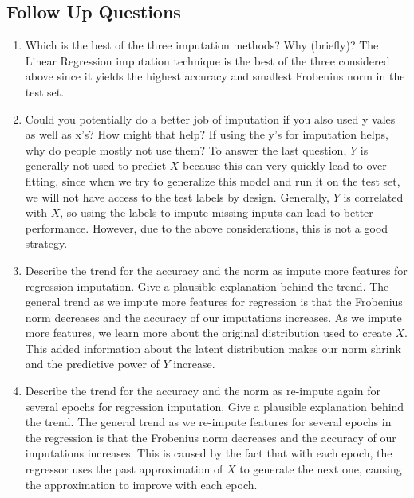 \subsection{Follow Up Questions}
\begin{enumerate}

    
    \item  Which is the best of the three imputation methods? Why (briefly)?
    	\newline \newline
    	The Linear Regression imputation technique is the best of the three considered above since it yields the highest accuracy and smallest Frobenius norm in the test set.
     
      \item Could you potentially do a better job of imputation if you also used y vales as well as x's? How might that help? If using the y's for imputation helps, why do people mostly not use them?
      \newline
      \newline
      To answer the last question, $Y$ is generally  not used to predict $X$ because this can very quickly lead to over-fitting, since when we try to generalize this model and run it on the test set, we will not have access to the test labels by design. 
      \newline
      \newline
      Generally, $Y$ is correlated with $X$, so using the labels to impute missing inputs can lead to better performance. However, due to the above considerations, this is not a good strategy.
         
    \item Describe the trend for the accuracy and the norm as impute more features for regression imputation. Give a plausible explanation behind the trend.
    \newline
    \newline
	The general trend as we impute more features for regression is that the Frobenius norm decreases and the accuracy of our imputations increases.
    \newline
    \newline
    As we impute more features, we learn more about the original distribution used to create $X$. This added information about the latent distribution makes our norm shrink and the predictive power of $Y$ increase.    
    \item Describe the trend for the accuracy and the norm as re-impute again for several epochs for regression imputation. Give a plausible explanation behind the trend.
        \newline
        \newline
    	The general trend as we re-impute features for several epochs in the regression is that the Frobenius norm decreases and the accuracy of our imputations increases.
        \newline
        \newline
	This is caused by the fact that with each epoch, the regressor uses the past approximation of $X$ to generate the next one, causing the approximation to improve with each epoch.    
    
\end{enumerate}